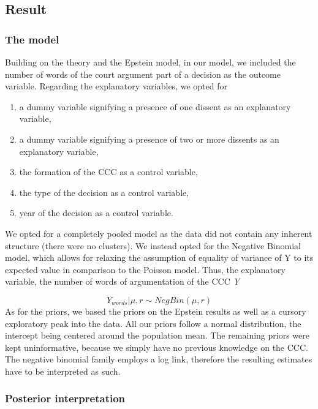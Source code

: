 \documentclass[
  11pt,
]{article}
\providecommand{\tightlist}{%
  \setlength{\itemsep}{0pt}\setlength{\parskip}{0pt}}
\begin{document}
\hypertarget{result}{%
\subsection{Result}\label{result}}

\hypertarget{the-model}{%
\subsubsection{The model}\label{the-model}}

Building on the theory and the Epstein model, in our model, we included
the number of words of the court argument part of a decision as the
outcome variable. Regarding the explanatory variables, we opted for

\begin{enumerate}
\def\labelenumi{(\arabic{enumi})}
\tightlist
\item
  a dummy variable signifying a presence of one dissent as an
  explanatory variable,
\item
  a dummy variable signifying a presence of two or more dissents as an
  explanatory variable,
\item
  the formation of the CCC as a control variable,
\item
  the type of the decision as a control variable,\\
\item
  year of the decision as a control variable.
\end{enumerate}

We opted for a completely pooled model as the data did not contain any
inherent structure (there were no clusters). We instead opted for the
Negative Binomial model, which allows for relaxing the assumption of
equality of variance of Y to its expected value in comparison to the
Poisson model. Thus, the explanatory variable, the number of words of
argumentation of the CCC \emph{Y}

\[
Y_{words} | \mu, r \sim NegBin(\mu, r)
\] As for the priors, we based the priors on the Epstein results as well
as a cursory exploratory peak into the data. All our priors follow a
normal distribution, the intercept being centered around the population
mean. The remaining priors were kept uninformative, because we simply
have no previous knowledge on the CCC. The negative binomial family
employs a log link, therefore the resulting estimates have to be
interpreted as such.

\hypertarget{posterior-interpretation}{%
\subsubsection{Posterior
interpretation}\label{posterior-interpretation}}
\end{document}
